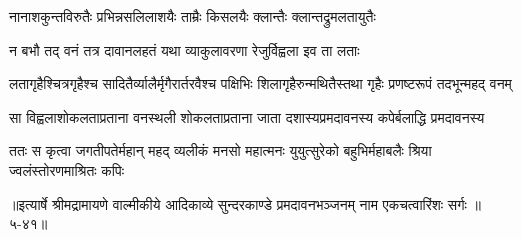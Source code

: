 \twolineshloka
{नानाशकुन्तविरुतैः प्रभिन्नसलिलाशयैः}
{ताम्रैः किसलयैः क्लान्तैः क्लान्तद्रुमलतायुतैः} %

\twolineshloka
{न बभौ तद् वनं तत्र दावानलहतं यथा}
{व्याकुलावरणा रेजुर्विह्वला इव ता लताः} %

\twolineshloka
{लतागृहैश्चित्रगृहैश्च सादितैर्व्यालैर्मृगैरार्तरवैश्च पक्षिभिः}
{शिलागृहैरुन्मथितैस्तथा गृहैः प्रणष्टरूपं तदभून्महद् वनम्} %

\twolineshloka
{सा विह्वलाशोकलताप्रताना वनस्थली शोकलताप्रताना}
{जाता दशास्यप्रमदावनस्य कपेर्बलाद्धि प्रमदावनस्य} %

\twolineshloka
{ततः स कृत्वा जगतीपतेर्महान् महद् व्यलीकं मनसो महात्मनः}
{युयुत्सुरेको बहुभिर्महाबलैः श्रिया ज्वलंस्तोरणमाश्रितः कपिः} %


॥इत्यार्षे श्रीमद्रामायणे वाल्मीकीये आदिकाव्ये सुन्दरकाण्डे प्रमदावनभञ्जनम् नाम एकचत्वारिंशः सर्गः ॥५-४१॥
